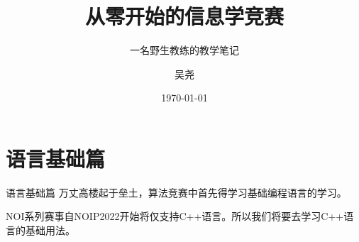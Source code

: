\documentclass[lang=cn,10pt]{OIBooks}
\title{从零开始的信息学竞赛}
\subtitle{一名野生教练的教学笔记}
\author{吴尧}
\date{\today}
\begin{document}
\maketitle%


\tableofcontents%

\mainmatter
\part{语言基础篇}{语言基础篇}
万丈高楼起于垒土，算法竞赛中首先得学习基础编程语言的学习。

NOI系列赛事自NOIP2022开始将仅支持C++语言。所以我们将要去学习C++语言的基础用法。




\printbibliography[heading=bibintoc, title=\ebibname]
\appendix


\end{document}
